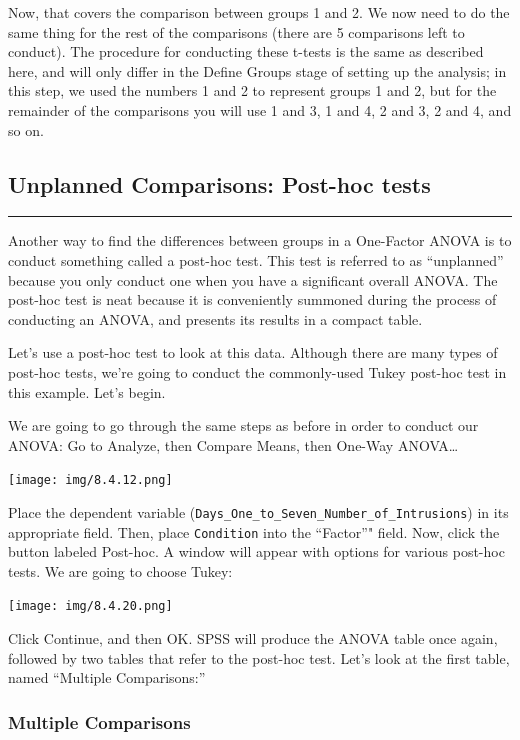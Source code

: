 \documentclass[]{book}
\begin{document}
Now, that covers the comparison between groups 1 and 2. We now need to
do the same thing for the rest of the comparisons (there are 5
comparisons left to conduct). The procedure for conducting these t-tests
is the same as described here, and will only differ in the {Define
Groups} stage of setting up the analysis; in this step, we used the
numbers 1 and 2 to represent groups 1 and 2, but for the remainder of
the comparisons you will use 1 and 3, 1 and 4, 2 and 3, 2 and 4, and so
on.

\subsection{Unplanned Comparisons: Post-hoc
tests}\label{unplanned-comparisons-post-hoc-tests}

\begin{center}\rule{0.5\linewidth}{0.5pt}\end{center}

Another way to find the differences between groups in a One-Factor ANOVA
is to conduct something called a post-hoc test. This test is referred to
as ``unplanned'' because you only conduct one when you have a
significant overall ANOVA. The post-hoc test is neat because it is
conveniently summoned during the process of conducting an ANOVA, and
presents its results in a compact table.

Let's use a post-hoc test to look at this data. Although there are many
types of post-hoc tests, we're going to conduct the commonly-used Tukey
post-hoc test in this example. Let's begin.

We are going to go through the same steps as before in order to conduct
our ANOVA: Go to {Analyze}, then {Compare Means}, then {One-Way
ANOVA\ldots{}}

\texttt{[image: img/8.4.12.png]}

Place the dependent variable
(\texttt{Days\_One\_to\_Seven\_Number\_of\_Intrusions}) in its
appropriate field. Then, place \texttt{Condition} into the ``Factor''"
field. Now, click the button labeled {Post-hoc}. A window will appear
with options for various post-hoc tests. We are going to choose {Tukey}:

\texttt{[image: img/8.4.20.png]}

Click {Continue}, and then {OK}. SPSS will produce the ANOVA table once
again, followed by two tables that refer to the post-hoc test. Let's
look at the first table, named ``Multiple Comparisons:''

\subsubsection{Multiple Comparisons}\label{multiple-comparisons}
\end{document}
